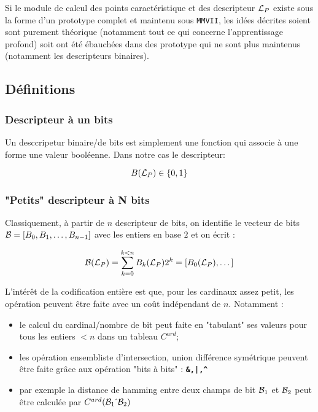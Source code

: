 Si le module de calcul des points caract\'eristique et des descripteur ${\mathcal L_P}$ existe sous 
la forme d'un prototype complet et maintenu sous {\tt MMVII}, les id\'ees d\'ecrites soient sont
purement th\'eorique (notamment tout ce qui concerne l'apprentissage profond) soit ont
\'et\'e \'ebauch\'ees dans des prototype qui ne sont plus maintenus (notamment les descripteurs
binaires).


\subsection{D\'efinitions}

\subsubsection{Descripteur \`a un bits}
Un desccripetur binaire/de bits est simplement une fonction qui associe \`a une forme une valeur bool\'eenne.
Dans notre cas le descripteur:

\begin{equation}
    B({\mathcal L_P}) \in \{0,1\}
\end{equation}

\subsubsection{"Petits" descripteur \`a N bits}

Classiquement, \`a partir de $n$ descripteur de bits,  on identifie
le vecteur de bits ${\mathcal B} = [B_0, B_1, \dots , B_{n-1}]$ avec les entiers en base $2$
et on \'ecrit   :

\begin{equation}
   {\mathcal B}({\mathcal L_P})  =  \sum_{k=0}^{k<n} B_k({\mathcal L_P}) 2^k  =  [B_0({\mathcal L_P}), \dots ]
\end{equation}

L'int\'er\^et de la codification enti\`ere est que, pour les  cardinaux assez petit, les op\'eration
peuvent \^etre faite avec un co\^ut ind\'ependant de $n$.  Notamment :

\begin{itemize}
   \item le calcul du cardinal/nombre de bit peut faite en "tabulant" ses valeurs pour tous les entiers $<n$
         dans un tableau $C^{ard}$;

   \item les op\'eration ensembliste d'intersection, union diff\'erence sym\'etrique peuvent être faite gr\^ace aux
         op\'eration "bits \`a bits"  : {\tt \bf  \&,|,\^{}}

   \item par exemple la distance de hamming entre deux champs de bit ${\mathcal B}_1$ et ${\mathcal B}_2$  peut \^etre 
         calcul\'ee par $C^{ard}({\mathcal B}_1 \hat{~}  {\mathcal B}_2)$

\end{itemize}

